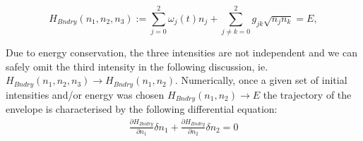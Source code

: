 \documentclass[9pt,twocolumn,twoside]{osajnl}
\begin{document}
\begin{equation}
H_{Bndry}(n_1,n_2,n_3) := \sum_{j=0}^{2} \omega_{j}(t) n_{j}  
+ \sum_{j \neq k = 0}^{2} g_{jk} \sqrt{n_{j} n_{k}} = E,	
\end{equation}

Due to energy conservation, the three intensities are not 
independent and we can safely omit the third intensity in the 
following discussion, ie. 
$H_{Bndry}(n_1,n_2,n_3) \rightarrow H_{Bndry}(n_1,n_2)$.
Numerically, once a given set of initial intensities and/or
energy was chosen $H_{Bndry}(n_1,n_2) \rightarrow E$ the 
trajectory of the envelope is characterised by the following differential equation:    
\begin{eqnarray}
\frac{\partial H_{Bndry}}{\partial n_1}\delta n_1 + 
\frac{\partial H_{Bndry}}{\partial n_2}\delta n_2 = 0
\end{eqnarray}
\end{document}
